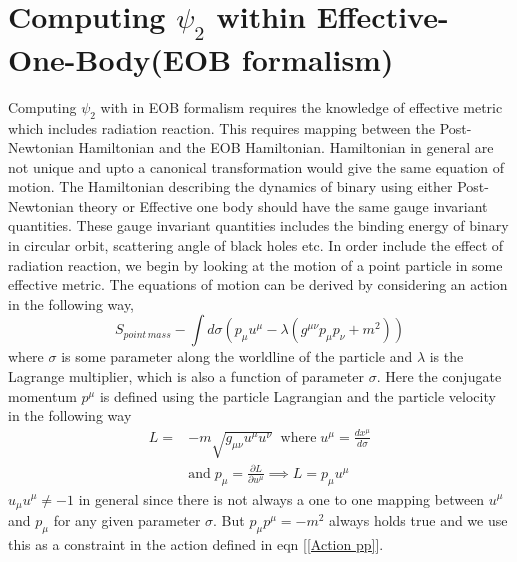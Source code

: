 \documentclass[prd,preprintnumbers,onecolumn,eqsecnum,floatfix,letter]{revtex4}
\begin{document}
\section{Computing $\psi_{2}$ within Effective-One-Body(EOB formalism)}
Computing $\psi_{2}$ with in EOB formalism requires the knowledge of effective metric which includes radiation reaction. This requires mapping between the Post-Newtonian Hamiltonian and the EOB Hamiltonian. Hamiltonian in general are not unique and upto a canonical transformation would give the same equation of motion. The Hamiltonian describing the dynamics of binary using either Post-Newtonian theory or Effective one body should have the same gauge invariant quantities. These gauge invariant quantities includes the binding energy of binary in circular orbit, scattering angle of black holes etc.  In order include the effect of radiation reaction, we begin by looking at the motion of a point particle in some effective metric. The equations of motion can be derived by considering an action in the following way,
\begin{equation}
	S_{point\,mass} -\int d\sigma\left(p_\mu u^\mu - \lambda\left(g^{\mu\nu} p_\mu p_\nu +  m^2\right)\right)
	\label{Action pp}
\end{equation}
where $\sigma$ is some parameter along the worldline of the particle and $\lambda$ is the Lagrange multiplier, which is also a function of parameter $\sigma$. Here the conjugate momentum $p^\mu$ is defined using the particle Lagrangian and the particle velocity in the following way
\begin{align}
	L = &-m\sqrt{g_{\mu\nu}u^{\mu}u^{\nu}} \;\;\text{where} \; u^{\mu} = \frac{dx^\mu}{d\sigma} \nonumber \\
	& \text{and} \; p_{\mu} = \frac{\partial L}{\partial u^{\mu}} \implies L = p_\mu u^\mu
\end{align}
$u_\mu u^\mu \neq -1$ in general since there is not always a one to one mapping between $u^\mu$ and $p_\mu$ for any given parameter $\sigma$. But $p_\mu p^\mu = -m^2$ always holds true and we use this as a constraint in the action defined in eqn [\ref{Action pp}]. 
\end{document}
